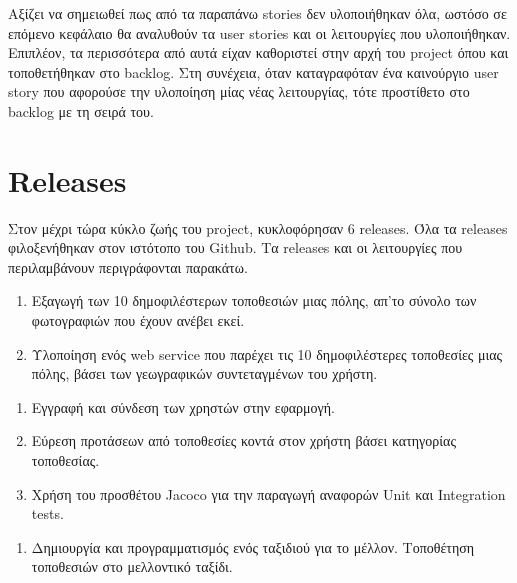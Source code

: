 \documentclass[oneside, 12pt]{book}
\begin{document}
\vspace{0.5cm}

Αξίζει να σημειωθεί πως από τα παραπάνω stories δεν υλοποιήθηκαν όλα, 
ωστόσο σε επόμενο κεφάλαιο θα αναλυθούν τα user stories και οι 
λειτουργίες που υλοποιήθηκαν.
Επιπλέον, τα περισσότερα από αυτά είχαν καθοριστεί στην αρχή του 
project όπου και τοποθετήθηκαν στο backlog.
Στη συνέχεια, όταν καταγραφόταν ένα καινούργιο user story που αφορούσε την υλοποίηση μίας νέας λειτουργίας, τότε προστίθετο στο backlog με τη σειρά του.
\section{Releases}
Στον μέχρι τώρα κύκλο ζωής του project, κυκλοφόρησαν 6 releases.
Όλα τα releases φιλοξενήθηκαν στον ιστότοπο του Github.
Τα releases και οι λειτουργίες που περιλαμβάνουν περιγράφονται παρακάτω.

{\large \color{blue}{TripAssistant 0.1.0}}
\begin{enumerate}
    \item Εξαγωγή των 10 δημοφιλέστερων τοποθεσιών μιας πόλης, απ'το σύνολο των φωτογραφιών που έχουν ανέβει εκεί.
    \item Υλοποίηση ενός web service που παρέχει τις 10 δημοφιλέστερες τοποθεσίες μιας πόλης, βάσει των γεωγραφικών συντεταγμένων του χρήστη.
\end{enumerate}

{\large \color{blue}{TripAssistant 0.2.0}}
\begin{enumerate}
    \item Εγγραφή και σύνδεση των χρηστών στην εφαρμογή.
    \item Εύρεση προτάσεων από τοποθεσίες κοντά στον χρήστη βάσει κατηγορίας τοποθεσίας.
    \item Χρήση του προσθέτου Jacoco για την παραγωγή αναφορών Unit και Integration tests.
\end{enumerate}

{\large \color{blue}{TripAssistant 0.3.0}}
\begin{enumerate}
    \item Δημιουργία και προγραμματισμός ενός ταξιδιού για το μέλλον.
    Τοποθέτηση τοποθεσιών στο μελλοντικό ταξίδι.
\end{enumerate}
\end{document}
